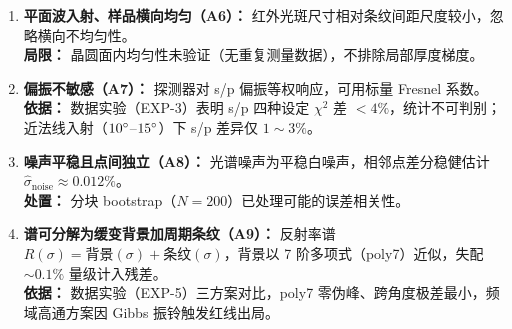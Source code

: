 \begin{enumerate}[itemindent=2em]
\item \textbf{平面波入射、样品横向均匀（A6）：} 红外光斑尺寸相对条纹间距尺度较小，忽略横向不均匀性。\\
\textbf{局限：} 晶圆面内均匀性未验证（无重复测量数据），不排除局部厚度梯度。

\item \textbf{偏振不敏感（A7）：} 探测器对 s/p 偏振等权响应，可用标量 Fresnel 系数。\\
\textbf{依据：} 数据实验（EXP-3）表明 s/p 四种设定 $\chi^2$ 差 $<4\%$，统计不可判别；近法线入射（$10^\circ$--$15^\circ$）下 s/p 差异仅 $1\sim3\%$。

\item \textbf{噪声平稳且点间独立（A8）：} 光谱噪声为平稳白噪声，相邻点差分稳健估计 $\hat{\sigma}_{\text{noise}}\approx0.012\%$。\\
\textbf{处置：} 分块 bootstrap（$N=200$）已处理可能的误差相关性。

\item \textbf{谱可分解为缓变背景加周期条纹（A9）：} 反射率谱 $R(\sigma)=\text{背景}(\sigma)+\text{条纹}(\sigma)$，背景以 7 阶多项式（poly7）近似，失配 $\sim0.1\%$ 量级计入残差。\\
\textbf{依据：} 数据实验（EXP-5）三方案对比，poly7 零伪峰、跨角度极差最小，频域高通方案因 Gibbs 振铃触发红线出局。
\end{enumerate}